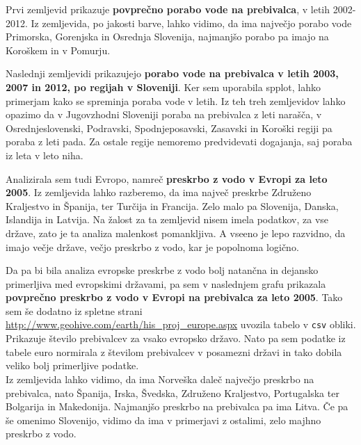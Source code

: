 \documentclass[11pt,a4paper]{article}
\begin{document}
Prvi zemljevid prikazuje \textbf{povprečno porabo vode na prebivalca}, v letih 2002-2012. Iz zemljevida, po jakosti barve, lahko vidimo, da ima največjo porabo vode Primorska, Gorenjska in Osrednja Slovenija, najmanjšo porabo pa imajo na Koroškem in v Pomurju.


\newpage
Naslednji zemljevidi prikazujejo \textbf{porabo vode na prebivalca v letih 2003, 2007 in 2012, po regijah v Sloveniji}. Ker sem uporabila spplot, lahko primerjam kako se spreminja poraba vode v letih. Iz teh treh zemljevidov lahko opazimo da v Jugovzhodni Sloveniji poraba na prebivalca z leti narašča, v Osrednjeslovenski, Podravski, Spodnjeposavski, Zasavski in Koroški regiji pa poraba z leti pada. Za ostale regije nemoremo predvidevati dogajanja, saj poraba iz leta v leto niha. 



\newpage

Analizirala sem tudi Evropo, namreč \textbf{preskrbo z vodo v Evropi za leto 2005}. Iz zemljevida lahko razberemo, da ima največ preskrbe Združeno Kraljestvo in Španija, ter Turčija in Francija. Zelo malo pa Slovenija, Danska, Islandija in Latvija. Na žalost za ta zemljevid nisem imela podatkov, za vse države, zato je ta analiza malenkost pomankljiva. A vseeno je lepo razvidno, da imajo večje države, večjo preskrbo z vodo, kar je popolnoma logično.



\newpage

Da pa bi bila analiza evropske preskrbe z vodo bolj natančna in dejansko primerljiva med evropskimi državami, pa sem v naslednjem grafu prikazala \textbf{povprečno preskrbo z vodo v Evropi na prebivalca za leto 2005}. Tako sem še dodatno iz spletne strani \url{http://www.geohive.com/earth/his_proj_europe.aspx} uvozila tabelo v \verb|csv| obliki. Prikazuje število prebivalcev za vsako evropsko državo. Nato pa sem podatke iz tabele euro normirala z številom prebivalcev v posamezni državi in tako dobila veliko bolj primerljive podatke.\\

Iz zemljevida lahko vidimo, da ima Norveška daleč največjo preskrbo na prebivalca, nato Španija, Irska, Švedska, Združeno Kraljestvo, Portugalska ter Bolgarija in Makedonija. Najmanjšo preskrbo na prebivalca pa ima Litva.
Če pa še omenimo Slovenijo, vidimo da ima v primerjavi z ostalimi, zelo majhno preskrbo z vodo.



% 
\end{document}
